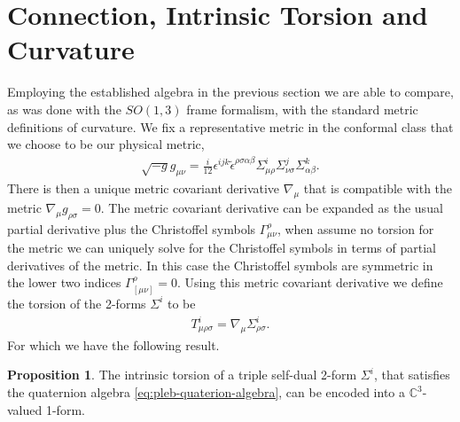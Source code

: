 \documentclass[10pt]{report}
\theoremstyle{definition}
\newtheorem{proposition}{Proposition}[chapter]
\newcommand{\C}[0]{\mathbb{C}}
\newcommand{\E}[0]{\C^3}
\newcommand{\teps}[0]{\tilde{\epsilon}}
\begin{document}
\section{Connection, Intrinsic Torsion and Curvature} \label{sec:pleb-connection-torsion-and-curvature}
Employing the established algebra in the previous section we are able to compare, as was done with the $SO(1,3)$ frame formalism, with the standard metric definitions of curvature. We fix a representative metric in the conformal class that we choose to be our physical metric,
\begin{align}
    \sqrt{-g} g_{\mu\nu} = \frac{i}{12} \epsilon^{ijk} \teps^{\rho\sigma\alpha\beta} \Sigma^i_{\mu\rho} \Sigma^j_{\nu\sigma} \Sigma^k_{\alpha\beta}. \label{eq:pleb-urbantke-metric}
\end{align}
There is then a unique metric covariant derivative $\nabla_\mu$ that is compatible with the metric $\nabla_\mu g_{\rho\sigma} = 0$. The metric covariant derivative can be expanded as the usual partial derivative plus the Christoffel symbols $\Gamma^\rho_{\mu\nu}$, when assume no torsion for the metric we can uniquely solve for the Christoffel symbols in terms of partial derivatives of the metric. In this case the Christoffel symbols are symmetric in the lower two indices $\Gamma^\rho_{[\mu\nu]} = 0$. Using this metric covariant derivative we define the torsion of the 2-forms $\Sigma^i$ to be 
\begin{align}
    T_{\mu\rho\sigma}^i = \nabla_\mu \Sigma^i_{\rho\sigma}.
\end{align}
For which we have the following result.
\begin{proposition}
    The intrinsic torsion of a triple self-dual 2-form $\Sigma^i$, that satisfies the quaternion algebra \cref{eq:pleb-quaterion-algebra}, can be encoded into a $\E$-valued 1-form.
\end{proposition}
\end{document}
